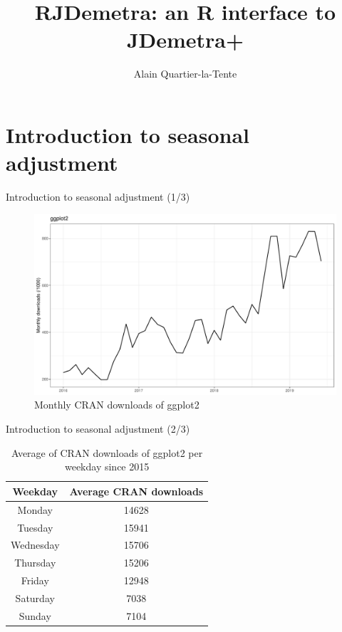 \documentclass[10pt,xcolor=table,color={dvipsnames,usenames},ignorenonframetext,usepdftitle=false,french]{beamer}
\title{RJDemetra: an R interface to JDemetra+}
\author{Alain Quartier-la-Tente}
\date{}
\begin{document}
\begin{frame}
\titlepage
\end{frame}

\hypertarget{introduction-to-seasonal-adjustment}{%
\section{Introduction to seasonal
adjustment}\label{introduction-to-seasonal-adjustment}}

\begin{frame}{Introduction to seasonal adjustment (1/3)}
\protect\hypertarget{introduction-to-seasonal-adjustment-13}{}

\begin{figure}
\centering
\includegraphics{img/markdown-unnamed-chunk-1-1.pdf}
\caption{Monthly CRAN downloads of ggplot2}
\end{figure}

\end{frame}

\begin{frame}{Introduction to seasonal adjustment (2/3)}
\protect\hypertarget{introduction-to-seasonal-adjustment-23}{}

\begin{table}
\begin{tabular}{cc}
\toprule
Weekday & Average CRAN downloads \\
\midrule
Monday & 14628\\
Tuesday & 15941\\
Wednesday & 15706\\
Thursday & 15206\\
Friday & 12948\\
Saturday & 7038\\
Sunday & 7104\\
\bottomrule
\end{tabular}
\caption{Average of CRAN downloads of ggplot2 per weekday since 2015}
\end{table}

\end{frame}
\end{document}
